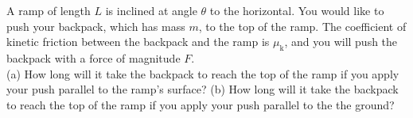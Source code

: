 A ramp of length $L$ is inclined at angle $\theta$ to the horizontal.
You would like to push your backpack, which has mass $m$, to the top of the ramp. The
coefficient of kinetic friction between the backpack and the ramp is
$\mu_\text{k}$, and you will push the backpack with a force of
magnitude $F$.\\
%
(a) How long will it take the backpack to reach the top of the ramp if
you apply your push parallel to the ramp's surface?\answercheck\hwendpart
%
(b) How long will it take the backpack to reach the top of the ramp if
you apply your push parallel to the the ground?\answercheck

